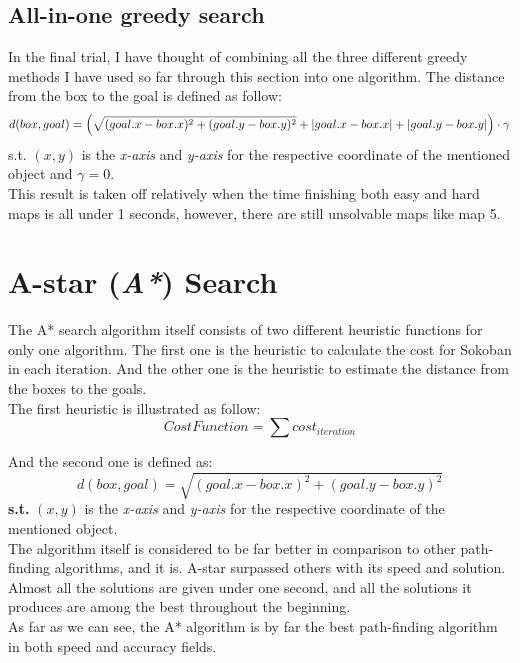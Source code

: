 \documentclass{article}
\begin{document}
\subsection{All-in-one greedy search}
In the final trial, I have thought of combining all the three different greedy methods I have used so far through this section into one algorithm. The distance from the box to the goal is defined as follow:
\begin{equation*}
    d(box, goal) = \left(\sqrt{(goal.x - box.x)^2 + (goal.y - box.y)^2} + \abs{goal.x - box.x} + \abs{goal.y - box.y}\right)\cdot \gamma 
\end{equation*}
s.t. $(x, y)$ is the \textit{x-axis} and \textit{y-axis} for the respective coordinate of the mentioned object and $\gamma = 0$.\\

This result is taken off relatively when the time finishing both easy and hard maps is all under 1 seconds, however, there are still unsolvable maps like map 5.
\section{A-star (\textit{A*}) Search}
The A* search algorithm itself consists of two different heuristic functions for only one algorithm. The first one is the heuristic to calculate the cost for Sokoban in each iteration. And the other one is the heuristic to estimate the distance from the boxes to the goals.\\

The first heuristic is illustrated as follow:
\begin{equation*}
    CostFunction = \sum cost_{iteration}
\end{equation*}

And the second one is defined as:
\begin{equation*}
    d(box, goal) = \sqrt{(goal.x - box.x)^2 + (goal.y - box.y)^2}
\end{equation*}
\textbf{s.t.} $(x, y)$ is the \textit{x-axis} and \textit{y-axis} for the respective coordinate of the mentioned object.\\

The algorithm itself is considered to be far better in comparison to other path-finding algorithms, and it is. A-star surpassed others with its speed and solution. Almost all the solutions are given under one second, and all the solutions it produces are among the best throughout the beginning. \\

As far as we can see, the A* algorithm is by far the best path-finding algorithm in both speed and accuracy fields.
\end{document}

